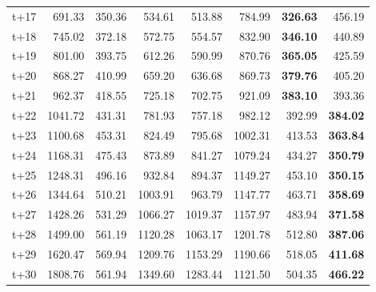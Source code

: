\begin{table}[H]
\begin{tabular}{lrrrrrrr}
t+17  & 691.33  & 350.36  & 534.61  & 513.88  & 784.99  & \textbf{326.63}  & 456.19  \\
t+18  & 745.02  & 372.18  & 572.75  & 554.57  & 832.90  & \textbf{346.10}  & 440.89  \\
t+19  & 801.00  & 393.75  & 612.26  & 590.99  & 870.76  & \textbf{365.05}  & 425.59  \\
t+20  & 868.27  & 410.99  & 659.20  & 636.68  & 869.73  & \textbf{379.76}  & 405.20  \\
t+21  & 962.37  & 418.55  & 725.18  & 702.75  & 921.09  & \textbf{383.10}  & 393.36  \\
t+22  & 1041.72  & 431.31  & 781.93  & 757.18  & 982.12  & 392.99  & \textbf{384.02}  \\
t+23  & 1100.68  & 453.31  & 824.49  & 795.68  & 1002.31  & 413.53  & \textbf{363.84}  \\
t+24  & 1168.31  & 475.43  & 873.89  & 841.27  & 1079.24  & 434.27  & \textbf{350.79}  \\
t+25  & 1248.31  & 496.16  & 932.84  & 894.37  & 1149.27  & 453.10  & \textbf{350.15}  \\
t+26  & 1344.64  & 510.21  & 1003.91  & 963.79  & 1147.77  & 463.71  & \textbf{358.69}  \\
t+27  & 1428.26  & 531.29  & 1066.27  & 1019.37  & 1157.97  & 483.94  & \textbf{371.58}  \\
t+28  & 1499.00  & 561.19  & 1120.28  & 1063.17  & 1201.78  & 512.80  & \textbf{387.06}  \\
t+29  & 1620.47  & 569.94  & 1209.76  & 1153.29  & 1190.66  & 518.05  & \textbf{411.68}  \\
t+30  & 1808.76  & 561.94  & 1349.60  & 1283.44  & 1121.50  & 504.35  & \textbf{466.22}  \\

\bottomrule
\end{tabular}
\end{table}
